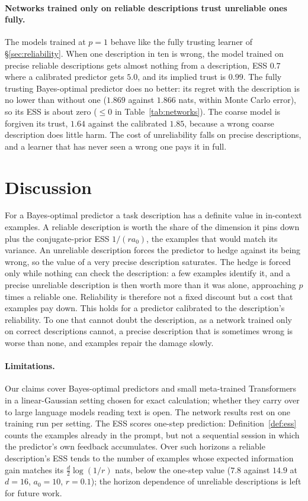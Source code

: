 \documentclass[10pt]{article}
\begin{document}
\paragraph{Networks trained only on reliable descriptions trust unreliable ones fully.}
The models trained at $p = 1$ behave like the fully trusting learner of \S\ref{sec:reliability}. When one description in ten is wrong, the model trained on precise reliable descriptions gets almost nothing from a description, ESS $0.7$ where a calibrated predictor gets $5.0$, and its implied trust is $0.99$. The fully trusting Bayes-optimal predictor does no better: its regret with the description is no lower than without one ($1.869$ against $1.866$ nats, within Monte Carlo error), so its ESS is about zero ($\le 0$ in Table~\ref{tab:networks}). The coarse model is forgiven its trust, $1.64$ against the calibrated $1.85$, because a wrong coarse description does little harm. The cost of unreliability falls on precise descriptions, and a learner that has never seen a wrong one pays it in full.

\section{Discussion}

For a Bayes-optimal predictor a task description has a definite value in in-context examples. A reliable description is worth the share of the dimension it pins down plus the conjugate-prior ESS $1/(r a_0)$, the examples that would match its variance. An unreliable description forces the predictor to hedge against its being wrong, so the value of a very precise description saturates. The hedge is forced only while nothing can check the description: a few examples identify it, and a precise unreliable description is then worth more than it was alone, approaching $p$ times a reliable one. Reliability is therefore not a fixed discount but a cost that examples pay down. This holds for a predictor calibrated to the description's reliability. To one that cannot doubt the description, as a network trained only on correct descriptions cannot, a precise description that is sometimes wrong is worse than none, and examples repair the damage slowly.

\paragraph{Limitations.}
Our claims cover Bayes-optimal predictors and small meta-trained Transformers in a linear-Gaussian setting chosen for exact calculation; whether they carry over to large language models reading text is open. The network results rest on one training run per setting. The ESS scores one-step prediction: Definition~\ref{def:ess} counts the examples already in the prompt, but not a sequential session in which the predictor's own feedback accumulates. Over such horizons a reliable description's ESS tends to the number of examples whose expected information gain matches its $\tfrac{d}{2}\log(1/r)$ nats, below the one-step value ($7.8$ against $14.9$ at $d = 16$, $a_0 = 10$, $r = 0.1$); the horizon dependence of unreliable descriptions is left for future work.
\end{document}
